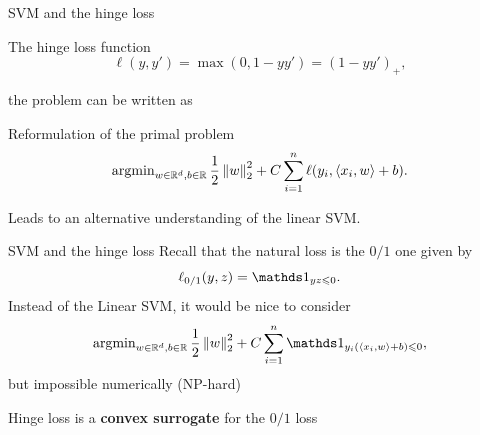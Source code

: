 \documentclass[xcolor={usenames,dvipsnames}]{beamer}
\begin{document}
 \begin{frame}{SVM and the hinge loss} 
 \begin{exampleblock}{The hinge loss function}
  \begin{equation*}
    \ell(y, y') = \max(0, 1 - y y') = (1 - y y')_+,
  \end{equation*}
  \end{exampleblock}
  the problem can be written as
  \begin{block}{Reformulation of the primal problem}
  \begin{equation*}
    \operatorname{argmin}_{w \in \mathbb{R}^d, b \in \mathbb{R}} \frac 12 \left\| w \right\|_2^2 + C 
    \sum_{i=1}^n \ell(y_i, \langle {x_i, w} \rangle + b).
  \end{equation*}
  \end{block}

  \medskip
  Leads to an alternative understanding of the linear SVM.

\end{frame}


\begin{frame}{SVM and the hinge loss}
  Recall that the natural loss is the $0/1$ one given by
  \begin{equation*}
    \ell_{0/1}(y, z) = \one_{yz \leq 0}.
  \end{equation*}  
  Instead of the Linear SVM, it would be nice to consider
  \begin{equation*}
        \argmin_{w \in \R^d, b \in \R} \frac 12 \norm{w}_2^2 + C \sum_{i=1}^n 
        \one_{y_i (\langle {x_i, w} \rangle  + b) \leq 0},
  \end{equation*}
  but impossible numerically (NP-hard)

  \bigskip
  Hinge loss is a \textbf{convex surrogate} for the $0/1$ loss
\end{frame}




  
\end{document}
